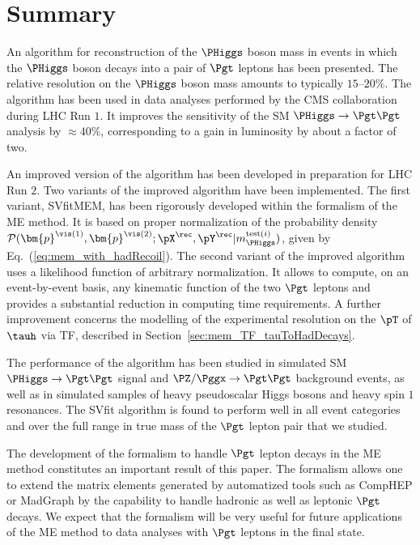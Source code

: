 \section{Summary}
\label{sec:summary}

An algorithm for reconstruction of the $\PHiggs$ boson mass in events
in which the $\PHiggs$ boson decays into a pair of $\Pgt$ leptons has been
presented.
The relative resolution on the $\PHiggs$ boson mass amounts to typically
$15$--$20\%$.
The algorithm has been used in data analyses performed by the CMS
collaboration during LHC Run $1$.
It improves the sensitivity of the SM $\PHiggs \to \Pgt\Pgt$ analysis by $\approx 40\%$,
corresponding to a gain in luminosity by about a factor of two.

An improved version of the algorithm has been developed in preparation
for LHC Run $2$.
Two variants of the improved algorithm have been implemented.
The first variant, SVfitMEM, has been rigorously developed within the
formalism of the ME method. It is based on proper normalization of the probability density 
$\mathcal{P}(\bm{p}^{\vis(1)},\bm{p}^{\vis(2)};\pX^{\rec},\pY^{\rec}|m_{\PHiggs}^{\textrm{test}(i)})$, given by Eq.~(\ref{eq:mem_with_hadRecoil}).
The second variant of the improved algorithm uses a likelihood
function of arbitrary normalization.
It allows to compute, on an event-by-event basis, any kinematic
function of the two $\Pgt$ leptons and provides a substantial reduction in computing time requirements.
A further improvement concerns the modelling of the experimental
resolution on the $\pT$ of $\tauh$ via TF, described in
Section~\ref{sec:mem_TF_tauToHadDecays}.

The performance of the algorithm has been studied in simulated SM
$\PHiggs \to \Pgt\Pgt$ signal and $\PZ/\Pggx \to \Pgt\Pgt$ background
events, as well as in simulated samples of heavy pseudoscalar Higgs
bosons and heavy spin $1$ resonances.
The SVfit algorithm is found to perform well in all event
categories and over the full range in true mass of the $\Pgt$ lepton
pair that we studied.

The development of the formalism to handle $\Pgt$ lepton decays
in the ME method constitutes an important result of this paper.
The formalism allows one to extend the matrix elements generated by automatized tools such as
CompHEP or MadGraph by the capability to handle hadronic as well as leptonic $\Pgt$ decays.
We expect that the formalism will be very useful for future
applications of the ME method to data analyses with $\Pgt$ leptons in
the final state. 
